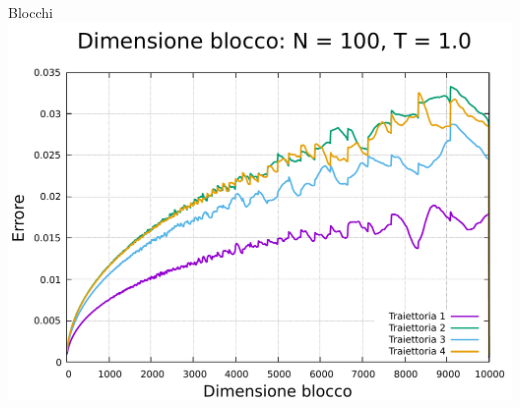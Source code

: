 \begin{frame}
\begin{columns}
\begin{column}{0.33\textwidth}
\begin{block}{Blocchi}
                \centering
                \includegraphics[width=\textwidth]{../ModelloXY/analisi/lblk/err/graphErr/lblk_100_1.0.pdf}

            \end{block}        
        \end{column}
    \end{columns}
\end{frame}




